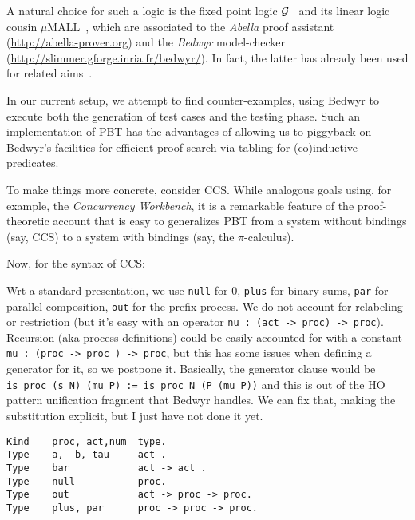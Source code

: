 \documentclass[a4paper]{easychair}
\begin{document}
A natural choice for such a logic is the fixed point logic $\cal
G$~\cite{Gacek2012} and its linear logic cousin $\mu\mathrm{MALL}$~\cite{Baelde12}, which are associated to the \emph{Abella} proof
assistant (\url{http://abella-prover.org}) and the \emph{Bedwyr} model-checker (\url{http://slimmer.gforge.inria.fr/bedwyr/}).  In fact, the latter
has already been used for related aims~\cite{HeathM15}.

In our current setup, we attempt to find counter-examples, using
Bedwyr to execute both the generation of test cases  and the testing phase.
%
Such an implementation of PBT has the advantages of allowing us to
piggyback on Bedwyr's facilities for efficient proof 
search via tabling for (co)inductive predicates.



To make things more concrete, consider CCS. While analogous goals
using, for example, the \emph{Concurrency Workbench}, it is a
remarkable feature of the proof-theoretic account that is easy to
generalizes PBT from a system without bindings (say, CCS) to a system
with bindings (say, the $\pi$-calculus).
%

%
Now, for the syntax of CCS:
  

  Wrt a standard presentation, we use \texttt{null} for $0$,
  \texttt{plus} for binary sums, \texttt{par} for parallel
  composition, \texttt{out} for the prefix process. We do not account
  for relabeling or restriction (but it's easy with an operator
  \texttt{nu : (act -> proc) -> proc}). Recursion (aka process
  definitions) could be easily accounted for with a constant \texttt{mu
    : (proc -> proc ) -> proc}, but this has some issues when defining
  a generator for it, so we postpone it. Basically, the generator
  clause would be \verb|is_proc (s N) (mu P) := is_proc N (P (mu P))|
  and this is out of the HO pattern unification fragment that Bedwyr
  handles. We can fix that, making the substitution explicit, but I
  just have not done it yet.


\begin{lstlisting}
Kind    proc, act,num  type.
Type    a,  b, tau     act .
Type    bar            act -> act .
Type    null           proc.
Type    out            act -> proc -> proc.
Type    plus, par      proc -> proc -> proc.
\end{lstlisting}
\end{document}
